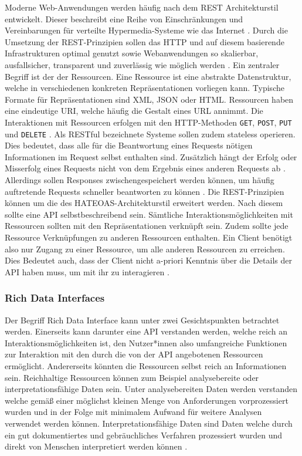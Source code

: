 Moderne Web-Anwendungen werden häufig nach dem REST Architekturstil entwickelt. Dieser beschreibt eine Reihe von Einschränkungen und Vereinbarungen für 
verteilte Hypermedia-Systeme wie das Internet \cite{api_design}. 
Durch die Umsetzung der REST-Prinzipien sollen das HTTP und auf diesem basierende Infrastrukturen optimal genutzt sowie Webanwendungen so skalierbar, ausfallsicher, transparent 
und zuverlässig wie möglich werden \cite{api_design,testbed_11}. 
Ein zentraler Begriff ist der der Ressourcen. Eine Ressource ist eine abstrakte Datenstruktur, welche in verschiedenen konkreten Repräsentationen vorliegen kann. 
Typische Formate für Repräsentationen sind XML, JSON oder HTML. 
Ressourcen haben eine eindeutige URI, welche häufig die Gestalt eines URL annimmt. 
Die Interaktionen mit Ressourcen erfolgen mit den HTTP-Methoden \verb|GET|, \verb|POST|, \verb|PUT| und \verb|DELETE| \cite{api_design}.  
Als RESTful bezeichnete Systeme sollen zudem stateless operieren. Dies bedeutet, dass alle für die Beantwortung eines Requests nötigen Informationen im Request selbst enthalten sind. 
Zusätzlich hängt der Erfolg oder Misserfolg eines Requests nicht von dem Ergebnis eines anderen Requests ab \cite{api_design,testbed_11}. 
Allerdings sollen Responses zwischengespeichert werden können, um häufig auftretende Requests schneller beantworten zu können \cite{testbed_11}.
Die REST-Prinzipien können um die des HATEOAS-Architekturstil erweitert werden. Nach diesem sollte eine API selbstbeschreibend sein. Sämtliche Interaktionsmöglichkeiten 
mit Ressourcen sollten mit den Repräsentationen verknüpft sein. Zudem sollte jede Ressource Verknüpfungen zu anderen Ressourcen enthalten. Ein Client benötigt also nur Zugang 
zu einer Ressource, um alle anderen Ressourcen zu erreichen. Dies Bedeutet auch, dass der Client nicht a-priori Kenntnis über die Details der 
API haben muss, um mit ihr zu interagieren \cite{api_design}. 

\subsubsection{Rich Data Interfaces}
Der Begriff Rich Data Interface kann unter zwei Gesichtspunkten betrachtet werden. Einerseits kann darunter eine API verstanden werden, welche 
reich an Interaktionsmöglichkeiten ist, den Nutzer*innen also umfangreiche Funktionen zur Interaktion mit den durch die von der API angebotenen Ressourcen ermöglicht.
Andererseits könnten die Ressourcen selbst reich an Informationen sein. %
Reichhaltige Ressourcen können zum Beispiel analysebereite oder interpretationsfähige Daten sein.
Unter analysebereiten Daten werden verstanden welche gemäß einer möglichst kleinen Menge von Anforderungen vorprozessiert wurden und in der Folge mit minimalem Aufwand
für weitere Analysen verwendet werden können. Interpretationsfähige Daten sind Daten welche durch ein gut dokumentiertes und gebräuchliches Verfahren prozessiert wurden 
und direkt von Menschen interpretiert werden können \cite{testbed_16}. 

